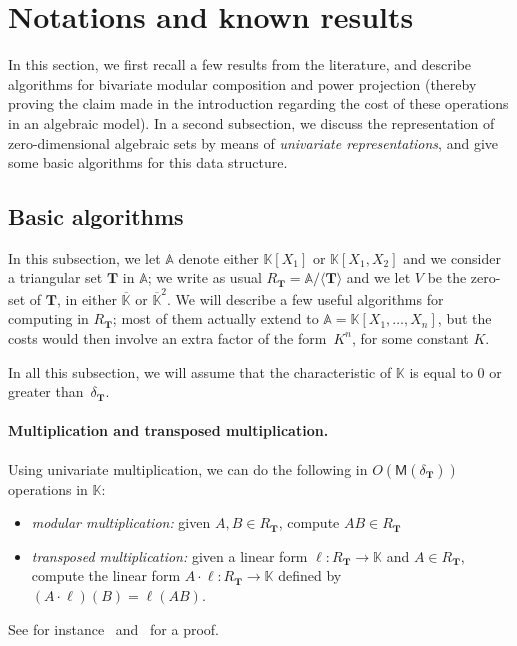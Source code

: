 \documentclass[12pt]{article}
\def\K {\ensuremath{\mathbb{K}}}
\def\Kbar {\ensuremath{\overline{\mathbb{K}}}}
\def\A {\ensuremath{\mathbb{A}}}
\def\M {\ensuremath{\mathsf{M}}}
\def\Tt {\ensuremath{\mathbf{T}}}
\begin{document}
\section{Notations and known results}\label{sec:notation}

In this section, we first recall a few results from the literature,
and describe algorithms for bivariate modular composition and power
projection (thereby proving the claim made in the introduction
regarding the cost of these operations in an algebraic model). In a
second subsection, we discuss the representation of zero-dimensional
algebraic sets by means of {\em univariate representations}, and give
some basic algorithms for this data structure.



\subsection{Basic algorithms}\label{ssec:basics}

In this subsection, we let $\A$ denote either $\K[X_1]$ or
$\K[X_1,X_2]$ and we consider a triangular set $\Tt$ in $\A$; we write
as usual $R_\Tt=\A/\langle \Tt\rangle$ and we let $V$ be the zero-set
of $\Tt$, in either $\Kbar$ or $\Kbar^2$. We will describe a few
useful algorithms for computing in $R_\Tt$; most of them actually
extend to $\A=\K[X_1,\dots,X_n]$, but the costs would then involve an
extra factor of the form~$K^n$, for some constant $K$.

In all this subsection, we will assume that the characteristic of $\K$
is equal to $0$ or greater than~$\delta_\Tt$.

\paragraph{Multiplication and transposed multiplication.}
Using univariate multiplication, we can do the following in
$O(\M(\delta_\Tt))$ operations in $\K$:
\begin{itemize}
\item {\em modular multiplication:} given $A,B \in R_\Tt$, compute $AB
  \in R_\Tt$
\item {\em transposed multiplication:} given a linear form $\ell:R_\Tt
  \to \K$ and $A\in R_\Tt$, compute the linear form $A\cdot \ell:
  R_\Tt \to \K$ defined by $(A\cdot \ell)(B)=\ell(AB)$.
\end{itemize}
See for instance~\cite{GaSh92} and~\cite{PaSc06} for a proof.
\end{document}
